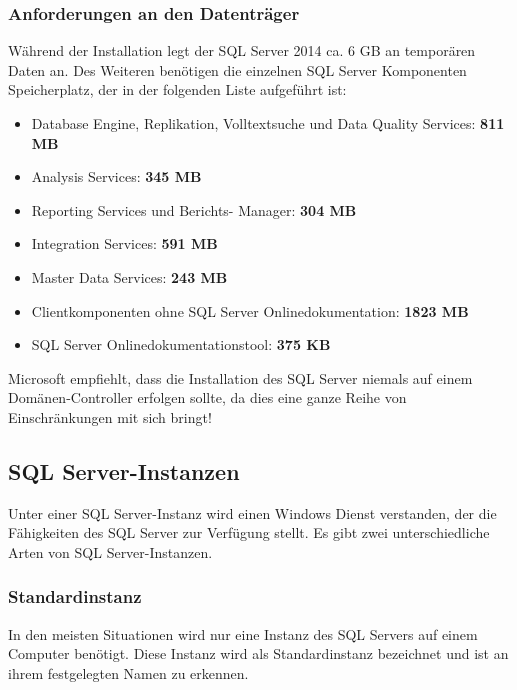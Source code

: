         \subsubsection{Anforderungen an den Datenträger}
          Während der Installation legt der SQL Server 2014 ca. 6 GB an temporären
          Daten an. Des Weiteren benötigen die einzelnen SQL Server Komponenten
          Speicherplatz, der in der folgenden Liste aufgeführt ist:
          \begin{itemize}
              \item Database Engine, Replikation, Volltextsuche und Data Quality
              Services: \textbf{811 MB}
              \item Analysis Services: \textbf{345 MB}
              \item Reporting Services und Berichts- Manager: \textbf{304 MB}
              \item Integration Services: \textbf{591 MB}
              \item Master Data Services: \textbf{243 MB}
              \item Clientkomponenten ohne SQL Server Onlinedokumentation:
              \textbf{1823 MB}
              \item SQL Server Onlinedokumentationstool: \textbf{375 KB}
          \end{itemize}
          \begin{merke}
            Microsoft empfiehlt, dass die Installation des SQL Server niemals auf
            einem Domänen-Controller erfolgen sollte, da dies eine ganze Reihe von
            Einschränkungen mit sich bringt!
          \end{merke}
          \begin{literaturinternet}
            \item \cite{ms143506}
          \end{literaturinternet}
      \subsection{SQL Server-Instanzen}
        Unter einer SQL Server-Instanz wird einen Windows Dienst verstanden, der
        die Fähigkeiten des SQL Server zur Verfügung stellt. Es gibt zwei
        unterschiedliche Arten von SQL Server-Instanzen.
        \subsubsection{Standardinstanz}
          In den meisten Situationen wird nur eine Instanz des SQL Servers auf
          einem Computer benötigt. Diese Instanz wird als Standardinstanz
          bezeichnet und ist an ihrem festgelegten Namen 
          zu erkennen.
